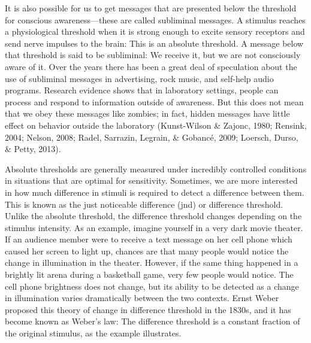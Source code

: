 It is also possible for us to get messages that are presented below the threshold for conscious awareness—these are called subliminal messages. A stimulus reaches a physiological threshold when it is strong enough to excite sensory receptors and send nerve impulses to the brain: This is an absolute threshold. A message below that threshold is said to be subliminal: We receive it, but we are not consciously aware of it. Over the years there has been a great deal of speculation about the use of subliminal messages in advertising, rock music, and self-help audio programs. Research evidence shows that in laboratory settings, people can process and respond to information outside of awareness. But this does not mean that we obey these messages like zombies; in fact, hidden messages have little effect on behavior outside the laboratory (Kunst-Wilson \& Zajonc, 1980; Rensink, 2004; Nelson, 2008; Radel, Sarrazin, Legrain, \& Gobancé, 2009; Loersch, Durso, \& Petty, 2013).

Absolute thresholds are generally measured under incredibly controlled conditions in situations that are optimal for sensitivity. Sometimes, we are more interested in how much difference in stimuli is required to detect a difference between them. This is known as the just noticeable difference (jnd) or difference threshold. Unlike the absolute threshold, the difference threshold changes depending on the stimulus intensity. As an example, imagine yourself in a very dark movie theater. If an audience member were to receive a text message on her cell phone which caused her screen to light up, chances are that many people would notice the change in illumination in the theater. However, if the same thing happened in a brightly lit arena during a basketball game, very few people would notice. The cell phone brightness does not change, but its ability to be detected as a change in illumination varies dramatically between the two contexts. Ernst Weber proposed this theory of change in difference threshold in the 1830s, and it has become known as Weber’s law: The difference threshold is a constant fraction of the original stimulus, as the example illustrates.



